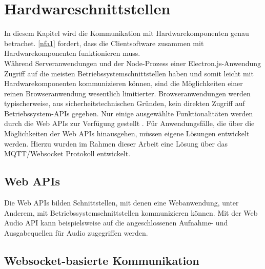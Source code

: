 \chapter{Hardwareschnittstellen}
\label{chap:hardwareschnittstellen}

In diesem Kapitel wird die Kommunikation mit Hardwarekomponenten genau betrachet.
\ref{nfa1} fordert, dass die Clientsoftware zusammen mit Hardwarekomponenten funktionieren muss.\\
Während Serveranwendungen und der Node-Prozess einer Electron.js-Anwendung Zugriff auf die meisten
Betriebssystemschnittstellen haben und somit leicht mit Hardwarekomponenten kommunizieren können, sind
die Möglichkeiten einer reinen Browseranwendung wesentlich limitierter. Browseranwendungen werden
typischerweise, aus sicherheitstechnischen Gründen, kein direkten Zugriff auf Betriebssystem-APIs gegeben.
Nur einige ausgewählte Funktionalitäten werden durch die Web APIs zur Verfügung gestellt \cite{web-apis}.
Für Anwendungsfälle, die über die Möglichkeiten der Web APIs hinausgehen, müssen eigene Lösungen entwickelt 
werden. Hierzu wurden im Rahmen dieser Arbeit eine Lösung über das MQTT/Websocket Protokoll entwickelt.

\section{Web APIs}
Die Web APIs bilden Schnittstellen, mit denen eine Webanwendung, unter Anderem, mit Betriebssystemschnittstellen
kommunizieren können. Mit der Web Audio API kann beispielsweise auf die angeschlossenen Aufnahme- und Ausgabequellen
für Audio zugegriffen werden. 
\section{Websocket-basierte Kommunikation}